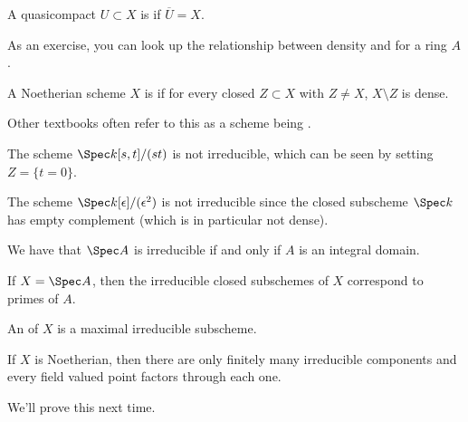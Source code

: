 \begin{defn}
A quasicompact $U \subset X$ is  if $\overline{U} = X$. 
\end{defn}

As an exercise, you can look up the relationship between density and  for a ring $A$. 

\begin{defn}
A Noetherian scheme $X$ is  if for every closed $Z \subset X$ with $Z \neq X$, $X \setminus Z$ is dense. 
\end{defn}

\begin{rem}
Other textbooks often refer to this as a scheme being .
\end{rem}

\begin{exampx}
The scheme $\Spec k[s,t]/(st)$ is not irreducible, which can be seen by setting $Z = \{t = 0\}$.
\end{exampx}

\begin{exampx}
The scheme $\Spec k[\epsilon]/(\epsilon^2)$ is not irreducible since the closed subscheme $\Spec k$ has empty complement (which is in particular not dense). 
\end{exampx}

\begin{ex}
We have that $\Spec A$ is irreducible if and only if $A$ is an integral domain.
\end{ex}

\begin{ex}
If $X = \Spec A$, then the irreducible closed subschemes of $X$ correspond to primes of $A$. 
\end{ex}

\begin{defn}
An  of $X$ is a maximal irreducible subscheme.
\end{defn}

\begin{lem}
If $X$ is Noetherian, then there are only finitely many irreducible components and every field valued point factors through each one.
\end{lem}

We'll prove this next time. 
